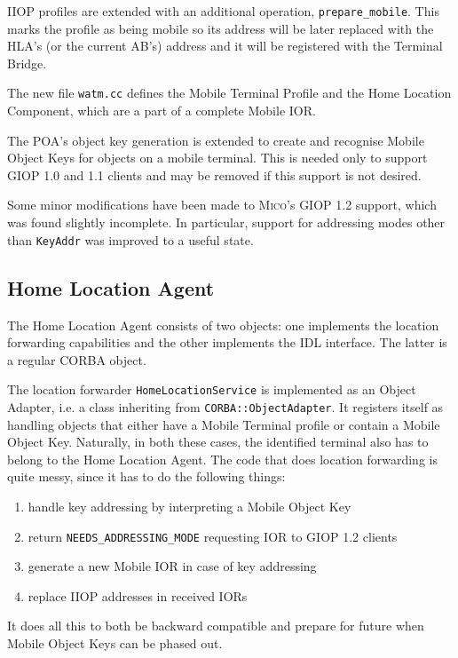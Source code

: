 \documentclass[12pt,a4paper,draft]{article}
\newcommand{\MICO}{\textsc{Mico}}
\begin{document}
IIOP profiles are extended with an additional operation,
\texttt{prepare\_mobile}.  This marks the profile as being mobile so
its address will be later replaced with the HLA's (or the current
AB's) address and it will be registered with the Terminal Bridge.

The new file \texttt{watm.cc} defines the Mobile Terminal Profile and
the Home Location Component, which are a part of a complete Mobile
IOR.

The POA's object key generation is extended to create and recognise
Mobile Object Keys for objects on a mobile terminal.  This is needed
only to support GIOP 1.0 and 1.1 clients and may be removed if this
support is not desired.

Some minor modifications have been made to \MICO{}'s GIOP 1.2 support,
which was found slightly incomplete.  In particular, support for
addressing modes other than \texttt{KeyAddr} was improved to a useful
state.

\subsection{Home Location Agent}
\label{sec:hla}

The Home Location Agent consists of two objects: one implements the
location forwarding capabilities and the other implements the IDL
interface.  The latter is a regular CORBA object.

The location forwarder \texttt{HomeLocationService} is implemented as
an Object Adapter, i.e. a class inheriting from
\texttt{CORBA::ObjectAdapter}.  It registers itself as handling
objects that either have a Mobile Terminal profile or contain a Mobile
Object Key.  Naturally, in both these cases, the identified terminal
also has to belong to the Home Location Agent.  The code that does
location forwarding is quite messy, since it has to do the following
things:
\begin{enumerate}
\item handle key addressing by interpreting a Mobile Object Key
\item return \texttt{NEEDS\_ADDRESSING\_MODE} requesting IOR to GIOP
  1.2 clients
\item generate a new Mobile IOR in case of key addressing
\item replace IIOP addresses in received IORs
\end{enumerate}
It does all this to both be backward compatible and prepare for future
when Mobile Object Keys can be phased out.
\end{document}
